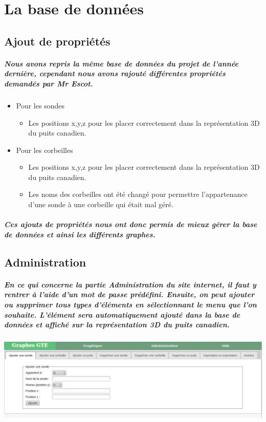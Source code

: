 \documentclass[12pt , a4paper,titlepage]{report}
\begin{document}
 \chapter{La base de données}
 \section{Ajout de propriétés}
 
 \paragraph{ Nous avons repris la même base de données du projet de l'année dernière, cependant nous avons rajouté différentes propriétés demandés 
par Mr Escot.}
	\begin{itemize}
		\item Pour les sondes
		\begin{itemize}
			\item Les positions x,y,z pour les placer correctement dans la représentation 3D du puits canadien.
		\end{itemize}
		\item Pour les corbeilles
		\begin{itemize}
			\item Les positions x,y,z pour les placer correctement dans la représentation 3D du puits canadien.
			\item Les noms des corbeilles ont été changé pour permettre l'appartenance d'une sonde à une corbeille qui était mal géré. 
		\end{itemize} 
	\end{itemize}
 \paragraph{   Ces ajouts de propriétés nous ont donc permis de mieux gérer la base de données et ainsi les différents graphes.  }
 \section{Administration}
	\paragraph{En ce qui concerne la partie Administration du site internet, il faut y rentrer à l'aide d'un mot de passe prédéfini. Ensuite, on
	peut ajouter ou supprimer tous types d'éléments en sélectionnant le menu que l'on souhaite. L'élément sera automatiquement ajouté dans la base 
	de données et affiché sur la représentation 3D du puits canadien.}
\begin{flushleft}\includegraphics[width=15cm]{administration.jpg}\end{flushleft}
\end{document}
